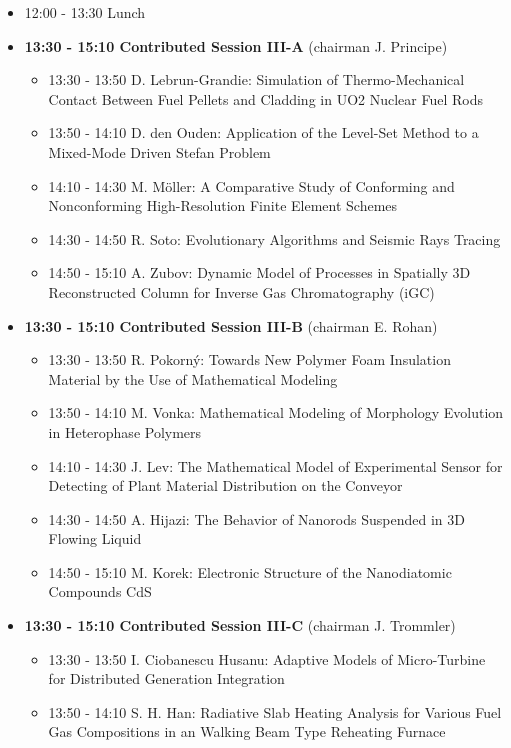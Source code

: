 \documentclass[10pt, A4]{article}%
\begin{document}
\begin{itemize}
\begin{itemize}
  \end{itemize}
  \item 12:00 - 13:30 Lunch
  \item {\bf 13:30 - 15:10 Contributed Session III-A} (chairman J. Principe) 
  \begin{itemize}
    \item 13:30 - 13:50 D. Lebrun-Grandie: Simulation of Thermo-Mechanical Contact Between Fuel Pellets and Cladding in UO2 Nuclear Fuel Rods
    \item 13:50 - 14:10 D. den Ouden: Application of the Level-Set Method to a Mixed-Mode Driven Stefan Problem
    \item 14:10 - 14:30 M. M\"{o}ller: A Comparative Study of Conforming and Nonconforming High-Resolution Finite Element Schemes
    \item 14:30 - 14:50 R. Soto: Evolutionary Algorithms and Seismic Rays Tracing
    \item 14:50 - 15:10 A. Zubov: Dynamic Model of Processes in Spatially 3D Reconstructed Column for Inverse Gas Chromatography (iGC)
  \end{itemize}
  \item {\bf 13:30 - 15:10 Contributed Session III-B} (chairman E. Rohan) 
  \begin{itemize}
    \item 13:30 - 13:50 R. Pokorn\'{y}: Towards New Polymer Foam Insulation Material by the Use of Mathematical Modeling
    \item 13:50 - 14:10 M. Vonka: Mathematical Modeling of Morphology Evolution in Heterophase Polymers
    \item 14:10 - 14:30 J. Lev: The Mathematical Model of Experimental Sensor for Detecting of Plant Material Distribution on the Conveyor
    \item 14:30 - 14:50 A. Hijazi: The Behavior of Nanorods Suspended in 3D Flowing Liquid
    \item 14:50 - 15:10 M. Korek: Electronic Structure of the Nanodiatomic Compounds CdS
  \end{itemize}
    \item {\bf 13:30 - 15:10 Contributed Session III-C} (chairman J. Trommler) 
  \begin{itemize}
    \item 13:30 - 13:50 I. Ciobanescu Husanu: Adaptive Models of Micro-Turbine for Distributed Generation Integration 
    \item 13:50 - 14:10 S. H. Han: Radiative Slab Heating Analysis for Various Fuel Gas Compositions in an Walking Beam Type Reheating Furnace

\end{itemize}
\end{itemize}
\end{document}
